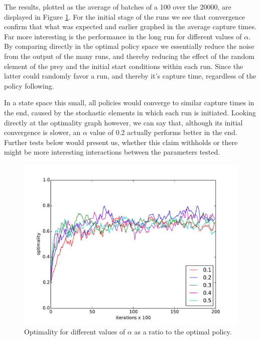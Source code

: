 \documentclass[paper=a4, fontsize=11pt]{scrartcl}
\numberwithin{equation}{section}		%
\numberwithin{figure}{section}			%
\numberwithin{table}{section}				%
\begin{document}
The results, plotted as the average of batches of a 100 over the 20000, are displayed in Figure \ref{figure:alphaOpti}. For the initial stage of the runs we see that convergence confirm that what was expected and earlier graphed in the average capture times. Far more interesting is the performance in the long run for different values of $\alpha$. By comparing directly in the optimal policy space we essentially reduce the noise from the output of the many runs, and thereby reducing the effect of the random element of the prey and the initial start conditions within each run. Since the latter could randomly favor a run, and thereby it's capture time, regardless of the policy following. 

In a state space this small, all policies would converge to similar capture times in the end, caused by the stochastic elements in which each run is initiated. Looking directly at the optimality graph however, we can say that, although its initial convergence is slower, an $\alpha$ value of 0.2 actually performs better in the end. Further tests below would present us, whether this claim withholds or there might be more interesting interactions between the parameters tested.
\begin{figure}[H] \centering
\includegraphics[scale=0.6]{alphaOptimality.pdf}
\caption{Optimality for different values of $\alpha$ as a ratio to the optimal policy.} 
\label{figure:alphaOpti}
\end{figure}
\end{document}
